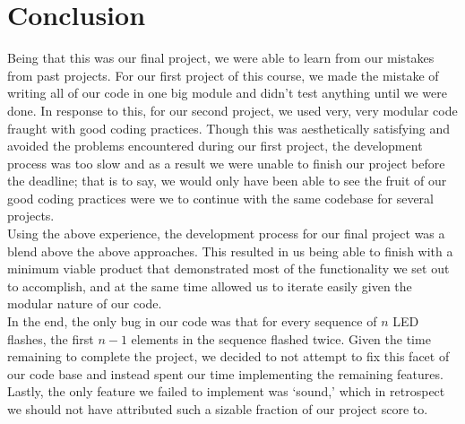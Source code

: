 \documentclass[]{article}
\begin{document}
\section{Conclusion}
Being that this was our final project, we were able to learn from our mistakes from past projects. For our first project of this course, we made the mistake of writing all of our code in one big module and didn't test anything until we were done. In response to this, for our second project, we used very, very modular code fraught with good coding practices. Though this was aesthetically satisfying and avoided the problems encountered during our first project, the development process was too slow and as a result we were unable to finish our project before the deadline; that is to say, we would only have been able to see the fruit of our good coding practices were we to continue with the same codebase for several projects.\\

Using the above experience, the development process for our final project was a blend above the above approaches. This resulted in us being able to finish with a minimum viable product that demonstrated most of the functionality we set out to accomplish, and at the same time allowed us to iterate easily given the modular nature of our code.\\

In the end, the only bug in our code was that for every sequence of $n$ LED flashes, the first $n-1$ elements in the sequence flashed twice. Given the time remaining to complete the project, we decided to not attempt to fix this facet of our code base and instead spent our time implementing the remaining features.\\

Lastly, the only feature we failed to implement was `sound,' which in retrospect we should not have attributed such a sizable fraction of our project score to.
\end{document}
